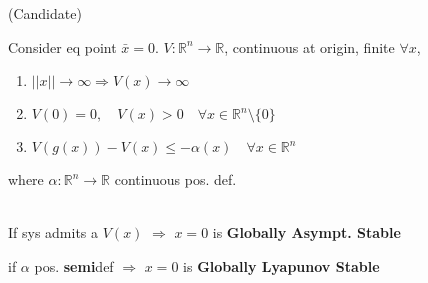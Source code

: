  (Candidate)

Consider eq point $\bar{x}=0$. $V:\mathbb{R}^n\to \mathbb{R}$, continuous at origin, finite $\forall x$,
\begin{enumerate}[label=\textbf{(\arabic*)}]
    \item $\lvert\lvert x \rvert\rvert \to \infty \Rightarrow V(x) \to \infty$
    \item $V(0)=0, \quad V(x)>0 \quad \forall x \in \mathbb{R}^n \setminus\{0\}$
    \item $V(g(x)) - V(x) \leq -\alpha(x) \quad \forall x \in \mathbb{R}^n$
\end{enumerate}
where $\alpha:\mathbb{R}^n\to \mathbb{R}$ continuous pos. def.


 \\

If sys admits a $V(x)$ $\Rightarrow$ $x=0$ is \textbf{Globally Asympt. Stable}


{\footnotesize
     if $\alpha$ pos. \textbf{semi}def $\Rightarrow$ $x=0$ is \textbf{Globally Lyapunov Stable}
}
